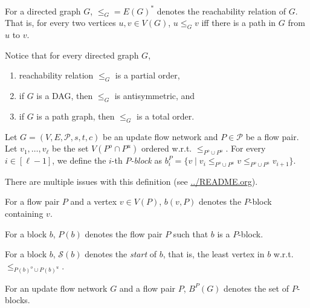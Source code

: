 \documentclass[fontsize=11pt,paper=a4]{book}
\begin{document}
\begin{notation}
For a directed graph \(G\), \(\leq_G=E(G)^*\) denotes the reachability relation of \(G\).
That is, for every two vertices \(u,v\in V(G)\), \(u\leq_Gv\) iff there is a path in \(G\) from \(u\) to \(v\).
\label{orgea6953d}
\end{notation}

Notice that for every directed graph \(G\),

\begin{enumerate}
\item reachability relation \(\leq_G\) is a partial order,

\item if \(G\) is a DAG, then \(\leq_G\) is antisymmetric, and

\item if \(G\) is a path graph, then \(\leq_G\) is a total order.
\end{enumerate}

\begin{defn}
Let \(G=(V,E,\mathcal{P},s,t,c)\) be an update flow network and \(P\in\mathcal{P}\) be a flow pair.
Let \(v_1,\dots,v_{\ell}\) be the set \(V(P^o\cap P^u)\) ordered w.r.t. \(\leq_{P^o\cup P^u}\).
For every \(i\in[\ell-1]\), we define the \(i\)-th \emph{\(P\)-block} as \(b_i^P=\{v\mid v_i\leq_{P^o\cup P^u}v\leq_{P^o\cup P^u}v_{i+1}\}\).
\label{orge56ea48}
\end{defn}

\begin{remark}
There are multiple issues with this definition (see \url{../README.org}).
\end{remark}

\begin{notation}
For a flow pair \(P\) and a vertex \(v\in V(P)\), \(b(v,P)\) denotes the \(P\)-block containing \(v\).
\label{org858ac17}
\end{notation}

\begin{notation}
For a block \(b\), \(P(b)\) denotes the flow pair \(P\) such that \(b\) is a \(P\)-block.
\label{orgc5c33ba}
\end{notation}

\begin{notation}
For a block \(b\), \(\mathcal{S}(b)\) denotes the \emph{start} of \(b\), that is, the least vertex in \(b\) w.r.t. \(\leq_{P(b)^o\cup P(b)^u}\).
\label{orga1fa224}
\end{notation}

\begin{notation}
For an update flow network \(G\) and a flow pair \(P\), \(B^P(G)\) denotes the set of \(P\)-blocks.
\label{orgb42e306}
\end{notation}
\end{document}
